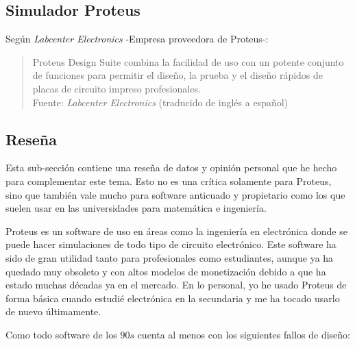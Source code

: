 \documentclass{article}
\begin{document}
    \subsection{Simulador Proteus}\label{subsec:simulador-proteus}

    Según \textit{Labcenter Electronics}\cite{labcenter-electronics-2022}
    -Empresa proveedora de Proteus-:

    \begin{quote}
        Proteus Design Suite combina la facilidad de uso con un potente
        conjunto de funciones para permitir el diseño, la prueba y el diseño
        rápidos de placas de circuito impreso profesionales.\\ \footnotesize
        Fuente: \textit{Labcenter Electronics} (traducido de inglés a
        español)~\cite{labcenter-electronics-2022}
    \end{quote}

    \subsection{Reseña}\label{subsec:review}

    Esta sub-sección contiene una reseña de datos y opinión personal que he
    hecho para complementar este tema. Esto no es una crítica solamente para
    Proteus, sino que también vale mucho para software anticuado y propietario
    como los que suelen usar en las universidades para matemática e ingeniería.

    \bigbreak

    Proteus es un software de uso en áreas como la ingeniería en electrónica
    donde se puede hacer simulaciones de todo tipo de circuito electrónico.
    Este software ha sido de gran utilidad tanto para profesionales como
    estudiantes, aunque ya ha quedado muy obsoleto y con altos modelos de
    monetización debido a que ha estado muchas décadas ya en el mercado. En
    lo personal, yo he usado Proteus de forma básica cuando estudié
    electrónica en la secundaria y me ha tocado usarlo de nuevo últimamente.

    \bigbreak

    Como todo software de los $90s$ cuenta al menos con los siguientes fallos
    de diseño:
\end{document}
